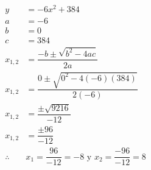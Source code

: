 {\begin{solutionbox}{10.5cm}
\begin{multicols}{2}
\[\begin{array}{rl}
                    y          & =	      -6x^2 +384
                    \\
                    a          & =-6
                    \\
                    b          & =0
                    \\
                    c          & =384
                    \\
                    x_{1,2}    & = \dfrac{-b\pm\sqrt{b^2-4ac}}{2a}
                    \\[2em]
                    x_{1,2}    & = \dfrac{0\pm\sqrt{0^2-4(-6)(384)}}{2(-6)}
                    \\[2em]
                    x_{1,2}    & = \dfrac{\pm\sqrt{9216}}{-12}
                    \\[2em]
                    x_{1,2}    & = \dfrac{\pm96}{-12}
                    \\[2em]
                    \therefore & x_1 =\dfrac{96}{-12}=-8 \text{ y }  x_2
                    =\dfrac{-96}{-12}=8                                     \\[2em]
                \end{array}
            \]
        \end{multicols}
    \end{solutionbox}
}